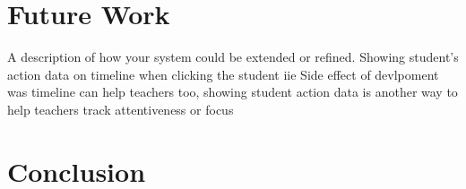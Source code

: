 \documentclass{sigchi}
\begin{document}
\section{Future Work}
A description of how your system could be extended or refined.
Showing student's action data on timeline when clicking the student iie Side effect of devlpoment was timeline can help teachers too, showing student action data is another way to help teachers track attentiveness or focus

\section{Conclusion}



%
%
%
%
%




\end{document}
